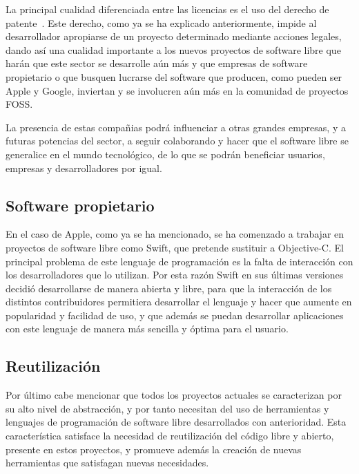 \documentclass[a4paper, spanish, 12pt]{book}
\begin{document}
La principal cualidad diferenciada entre las licencias es el uso del derecho de patente~\cite{licencias}. Este derecho, como ya se ha
explicado anteriormente, impide al desarrollador apropiarse de un proyecto determinado mediante acciones legales,
dando as\'i una cualidad importante a los nuevos proyectos de software libre que har\'an que este sector se desarrolle
a\'un m\'as y que empresas de software propietario o que busquen lucrarse del software que producen, como pueden ser
Apple y Google, inviertan y se involucren a\'un m\'as en la comunidad de proyectos FOSS.

La presencia de estas compa\~nias podr\'a influenciar a otras grandes empresas, y a futuras potencias del sector,
a seguir colaborando y hacer que el software libre se generalice en el mundo tecnol\'ogico, de lo que se podr\'an
beneficiar usuarios, empresas y desarrolladores por igual.

\subsection*{Software propietario}
\label{subsec:propietary_sw}

En el caso de Apple, como ya se ha mencionado, se ha comenzado a trabajar en proyectos de software libre
como Swift, que pretende sustituir a Objective-C. El principal problema
de este lenguaje de programaci\'on es la falta de interacci\'on con los desarrolladores que lo utilizan.
Por esta raz\'on Swift en sus \'ultimas versiones decidi\'o desarrollarse de manera abierta y libre, para que la interacci\'on
de los distintos contribuidores permitiera desarrollar el lenguaje y hacer que aumente en popularidad y facilidad de uso,
y que adem\'as se puedan desarrollar aplicaciones con este lenguaje de manera m\'as sencilla y \'optima para el usuario.

\subsection*{Reutilizaci\'on}
\label{subsec:reutilizacion}

Por \'ultimo cabe mencionar que todos los proyectos actuales se caracterizan por su alto nivel de abstracci\'on, y por
tanto necesitan del uso de herramientas y lenguajes de programaci\'on de software libre desarrollados con anterioridad.
Esta caracter\'istica satisface la necesidad de reutilizaci\'on del c\'odigo libre y abierto, presente en estos proyectos,
y promueve adem\'as la creaci\'on de nuevas herramientas que satisfagan nuevas necesidades.
\end{document}
